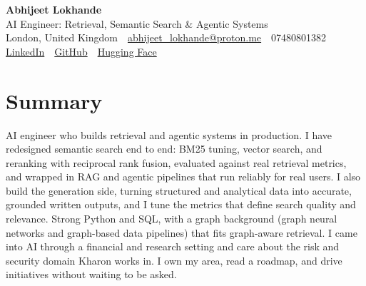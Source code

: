 \documentclass[10pt,a4paper]{article}
\newcommand{\sep}{\,\textcolor{accent!60}{\textbar}\,}
\begin{document}
\begin{center}
  {\fontsize{24}{26}\selectfont\bfseries Abhijeet Lokhande}\\[3pt]
  {\color{accent}\large AI Engineer: Retrieval, Semantic Search \& Agentic Systems}\\[5pt]
  {\small
    London, United Kingdom \sep
    \href{mailto:abhijeet_lokhande@proton.me}{abhijeet\_lokhande@proton.me} \sep
    07480801382 \\[2pt]
    \href{https://www.linkedin.com/in/ablds/}{LinkedIn} \sep
    \href{https://github.com/abhijeetscode}{GitHub} \sep
    \href{https://huggingface.co/ab-ai}{Hugging Face}
  }
\end{center}
\vspace{2pt}

\section{Summary}
AI engineer who builds retrieval and agentic systems in production. I have redesigned semantic search end to end: BM25 tuning, vector search, and reranking with reciprocal rank fusion, evaluated against real retrieval metrics, and wrapped in RAG and agentic pipelines that run reliably for real users. I also build the generation side, turning structured and analytical data into accurate, grounded written outputs, and I tune the metrics that define search quality and relevance. Strong Python and SQL, with a graph background (graph neural networks and graph-based data pipelines) that fits graph-aware retrieval. I came into AI through a financial and research setting and care about the risk and security domain Kharon works in. I own my area, read a roadmap, and drive initiatives without waiting to be asked.

\end{document}
